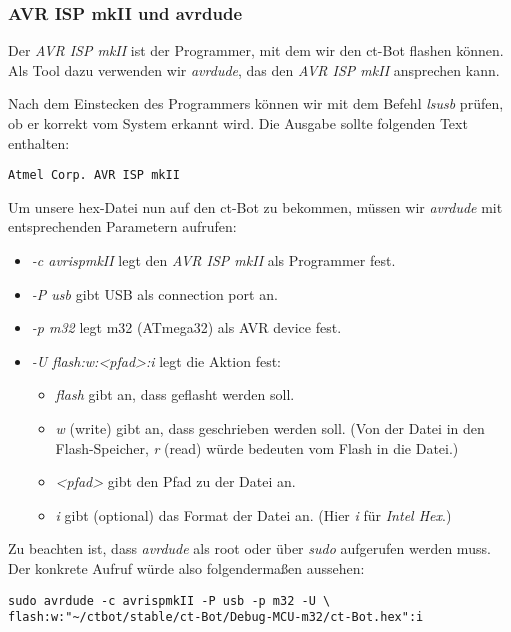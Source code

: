 \subsubsection{AVR ISP mkII und avrdude}
Der \textit{AVR ISP mkII} ist der Programmer, mit dem wir den ct-Bot flashen können. Als Tool dazu verwenden wir \textit{avrdude}, das den \textit{AVR ISP mkII} ansprechen kann.

Nach dem Einstecken des Programmers können wir mit dem Befehl \textit{lsusb} prüfen, ob er korrekt vom System erkannt wird. Die Ausgabe sollte folgenden Text enthalten:
\begin{lstlisting}
Atmel Corp. AVR ISP mkII
\end{lstlisting}
\newpage
Um unsere hex-Datei nun auf den ct-Bot zu bekommen, müssen wir \textit{avrdude} mit entsprechenden Parametern aufrufen:
\begin{itemize}
\item \textit{-c avrispmkII} legt den \textit{AVR ISP mkII} als Programmer fest.
\item \textit{-P usb} gibt USB als connection port an.
\item \textit{-p m32} legt m32 (ATmega32) als AVR device fest.
\item \textit{-U flash:w:<pfad>:i} legt die Aktion fest:
	\begin{itemize}
	\item \textit{flash} gibt an, dass geflasht werden soll.
	\item \textit{w} (write) gibt an, dass geschrieben werden soll. (Von der Datei in den Flash-Speicher, \textit{r} (read) würde bedeuten vom Flash in die Datei.)
	\item \textit{<pfad>} gibt den Pfad zu der Datei an.
	\item \textit{i} gibt (optional) das Format der Datei an. (Hier \textit{i} für \textit{Intel Hex}.)
	\end{itemize}
\end{itemize}
Zu beachten ist, dass \textit{avrdude} als root oder über \textit{sudo} aufgerufen werden muss.
Der konkrete Aufruf würde also folgendermaßen aussehen:
\begin{lstlisting}
sudo avrdude -c avrispmkII -P usb -p m32 -U \
flash:w:"~/ctbot/stable/ct-Bot/Debug-MCU-m32/ct-Bot.hex":i
\end{lstlisting}
